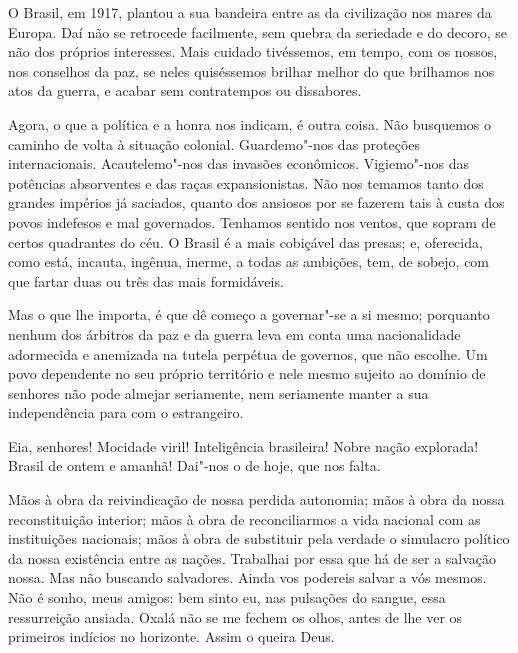 O Brasil, em 1917, plantou a sua bandeira entre as da civilização
nos mares da Europa. Daí não se retrocede facilmente, sem quebra da
seriedade e do decoro, se não dos próprios interesses. Mais cuidado
tivéssemos, em tempo, com os nossos, nos conselhos da paz, se neles
quiséssemos brilhar melhor do que brilhamos nos atos da guerra, e
acabar sem contratempos ou dissabores.

Agora, o que a política e a honra nos indicam, é outra coisa. Não
busquemos o caminho de volta à situação colonial. Guardemo"-nos das
proteções internacionais. Acautelemo"-nos das invasões econômicos.
Vigiemo"-nos das potências absorventes e das raças expansionistas. Não
nos temamos tanto dos grandes impérios já saciados, quanto dos ansiosos
por se fazerem tais à custa dos povos indefesos e mal governados.
Tenhamos sentido nos ventos, que sopram de certos quadrantes do céu. O
Brasil é a mais cobiçável das presas; e, oferecida, como está, incauta,
ingênua, inerme, a todas as ambições, tem, de sobejo, com que fartar
duas ou três das mais formidáveis.

Mas o que lhe importa, é que dê começo a governar"-se a si mesmo;
porquanto nenhum dos árbitros da paz e da guerra leva em conta uma
nacionalidade adormecida e anemizada na tutela perpétua de governos,
que não escolhe. Um povo dependente no seu próprio território e nele
mesmo sujeito ao domínio de senhores não pode almejar seriamente, nem
seriamente manter a sua independência para com o estrangeiro.

Eia, senhores! Mocidade viril! Inteligência brasileira! Nobre
nação explorada! Brasil de ontem e amanhã! Dai"-nos o de hoje, que nos falta.

Mãos à obra da reivindicação de nossa perdida autonomia; mãos à
obra da nossa reconstituição interior; mãos à obra de reconciliarmos a
vida nacional com as instituições nacionais; mãos à obra de substituir
pela verdade o simulacro político da nossa existência entre as nações.
Trabalhai por essa que há de ser a salvação nossa. Mas não buscando
salvadores. Ainda vos podereis salvar a vós mesmos. Não é sonho, meus
amigos: bem sinto eu, nas pulsações do sangue, essa ressurreição
ansiada. Oxalá não se me fechem os olhos, antes de lhe ver os primeiros
indícios no horizonte. Assim o queira Deus.

